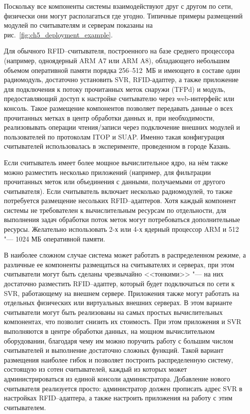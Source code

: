 Поскольку все компоненты системы взаимодействуют друг с другом по сети, физически они могут располагаться где угодно. Типичные примеры размещений модулей по считывателям и серверам показаны на рис.~\ref{fig:ch5_deployment_example}.

Для обычного RFID--считывателя, построенного на базе среднего процессора (например, одноядерный ARM A7 или ARM A8), обладающего небольшим объемом оперативной памяти порядка 256--512~МБ и имеющего в составе один радиомодуль, достаточно установить SVR, RFID-адаптер, а также приложение для подключения к потоку прочитанных меток снаружи (TFPd) и модуль, предоставляющий доступ к настройке считывателю через web-интерфейс или консоль. Такое размещение компонентов позволяет передавать данные о всех прочитанных метках в центр обработки данных и, при необходимости, реализовывать операции чтения/записи через подключение внешних модулей и пользователей по протоколам ITOP и SUAP. Именно такая конфигурация считывателей использовалась в эксперименте, проведенном в городе Казань.

Если считыватель имеет более мощное вычислительное ядро, на нём также можно разместить несколько приложений (например, для фильтрации прочитанных меток или объединения с данными, получаемыми от другого считывателя). Если считыватель включает несколько радиомодулей, то также потребуется размещение несольких RFID--адаптеров. Хотя каждый компонент системы не требователен к вычислительным ресурсам по отдельности, для выполнения задач обработки поток меток могут потребоваться дополнительные ресурсы. Желательно использовать 2-х или 4-х ядерный процессор ARM и 512 "--- 1024 МБ оперативной памяти.

В наиболее сложном случае система может работать в распределенном режиме, а различные ее компоненты размещаться на считывателях и серверах, при этом считыватели могут быть сделаны чрезвычайно <<тонкими>> "--- на них достаточно разместить RFID--адаптер, который будет подключаться по сети к SVR, работающему на внешнем сервере. Приложения также могут работать на отдельных физических или виртуальных внешних серверах. В этом варианте считыватели могут быть реализованы на самых простых вычислительных компонентах, что позволит снизить их стоимость. При этом приложения и SVR выполняются в центре обработки данных, на мощном вычислительном оборудовании, благодаря чему им можно поручить работу с большим числом считывателей и выполнение достаточно сложных функций. Такой вариант размещения наиболее гибок и позволяет построить распределенную систему, состоящую из сотен считывателей, каждый из которых может администрироваться из единой консоли администратора. Добавление нового считывателя реализуется просто: администратор должен прописать адрес SVR в настройках RFID--адаптера, а также настроить приложения на работу с этим считывателем.



